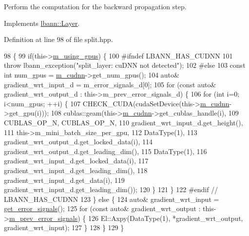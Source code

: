 Perform the computation for the backward propagation step. 

Implements \hyperlink{classlbann_1_1Layer_a7442e01f9ee1294df2de811efcf5171e}{lbann\+::\+Layer}.



Definition at line 98 of file split.\+hpp.


\begin{DoxyCode}
98                              \{
99     \textcolor{keywordflow}{if}(this->\hyperlink{classlbann_1_1Layer_af7881cb5eff5207c15fa835d65462e8f}{m\_using\_gpus}) \{
100 \textcolor{preprocessor}{  #ifndef LBANN\_HAS\_CUDNN}
101       \textcolor{keywordflow}{throw} lbann\_exception(\textcolor{stringliteral}{"split\_layer: cuDNN not detected"});
102 \textcolor{preprocessor}{  #else}
103       \textcolor{keyword}{const} \textcolor{keywordtype}{int} num\_gpus = \hyperlink{classlbann_1_1Layer_a08dbb94239e3b8c96329786c57c72e21}{m\_cudnn}->get\_num\_gpus();
104       \textcolor{keyword}{auto}& gradient\_wrt\_input\_d = m\_error\_signals\_d[0];
105       \textcolor{keywordflow}{for} (\textcolor{keyword}{const} \textcolor{keyword}{auto}& gradient\_wrt\_output\_d : this->m\_prev\_error\_signals\_d) \{
106         \textcolor{keywordflow}{for} (\textcolor{keywordtype}{int} i=0; i<num\_gpus; ++i) \{
107           CHECK\_CUDA(cudaSetDevice(this->\hyperlink{classlbann_1_1Layer_a08dbb94239e3b8c96329786c57c72e21}{m\_cudnn}->get\_gpu(i)));
108           cublas::geam(this->\hyperlink{classlbann_1_1Layer_a08dbb94239e3b8c96329786c57c72e21}{m\_cudnn}->get\_cublas\_handle(i),
109                        CUBLAS\_OP\_N, CUBLAS\_OP\_N,
110                        gradient\_wrt\_input\_d.get\_height(),
111                        this->m\_mini\_batch\_size\_per\_gpu,
112                        DataType(1),
113                        gradient\_wrt\_output\_d.get\_locked\_data(i),
114                        gradient\_wrt\_output\_d.get\_leading\_dim(),
115                        DataType(1),
116                        gradient\_wrt\_input\_d.get\_locked\_data(i),
117                        gradient\_wrt\_input\_d.get\_leading\_dim(),
118                        gradient\_wrt\_input\_d.get\_data(i),
119                        gradient\_wrt\_input\_d.get\_leading\_dim());
120         \}
121       \}
122 \textcolor{preprocessor}{  #endif // LBANN\_HAS\_CUDNN}
123     \} \textcolor{keywordflow}{else} \{
124       \textcolor{keyword}{auto}& gradient\_wrt\_input = \hyperlink{classlbann_1_1Layer_adb561e140e0bb601f3c5a8ee053a71d2}{get\_error\_signals}();
125       \textcolor{keywordflow}{for} (\textcolor{keyword}{const} \textcolor{keyword}{auto}& gradient\_wrt\_output : this->\hyperlink{classlbann_1_1Layer_a6fdcbf884150d0b20cffe678fefd7caa}{m\_prev\_error\_signals}) \{
126         El::Axpy(DataType(1), *gradient\_wrt\_output, gradient\_wrt\_input);
127       \}
128     \}
129   \}
\end{DoxyCode}

